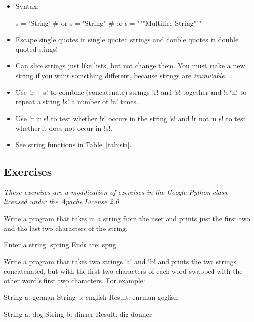 \documentclass[11pt]{cselabheader}
\begin{document}
\begin{itemize}
  \item Syntax:

    \begin{python3code}
s = 'String'
# or
s = "String"
# or
s = """Multiline
String"""
    \end{python3code}

  \item Escape single quotes in single quoted strings and double quotes in
    double quoted stings!

  \item Can slice strings just like lists, but not change them. You must make a
    new string if you want something different, because strings are
    \emph{immutable}.

  \item Use \pythoninline!r + s! to combine (concatenate) strings \pythoninline!r! and
    \pythoninline!s! together and
    \pythoninline!s*n! to repeat a string \pythoninline!s! a number of \pythoninline!n!
    times.

  \item Use \pythoninline!r in s! to test whether \pythoninline!r! occurs in the
    string \pythoninline!s! and \pythoninline!r not in s! to test whether it does not
    occur in \pythoninline!s!.

  \item See string functions in Table~\ref{tab:str}.
\end{itemize}

\subsection{Exercises}
\label{subsec:stringsex}

\emph{These exercises are a modification of exercises in the Google Python
  class, licensed under the
  \href{http://www.apache.org/licenses/LICENSE-2.0.html}{Apache License 2.0}.}

\begin{ex}[ends.py] Write a program that takes in a string from the user and
  prints just the first two and the last two characters of the string.

  \begin{verbatimcode}
Enter a string: spring
Ends are: spng
  \end{verbatimcode}
\end{ex}

\begin{ex}[mix.py] Write a program that takes two strings \pythoninline!a! and
  \pythoninline!b! and prints the two strings concatenated, but with the first
  two characters of each word swapped with the other word's first two
  characters. For example:

  \begin{verbatimcode}
String a: german
String b: english
Result: enrman geglish
  \end{verbatimcode}

  \begin{verbatimcode}
String a: dog
String b: dinner
Result: dig donner
  \end{verbatimcode}
\end{ex}
\end{document}
